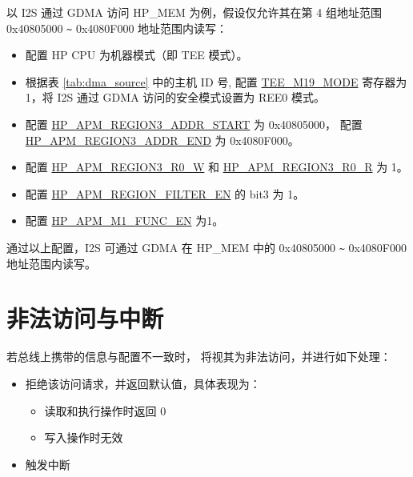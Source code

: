\documentclass[main\_\_CN.tex]{subfiles}
\begin{document}
以 I2S 通过 GDMA 访问 HP\_MEM 为例，假设仅允许其在第 4 组地址范围 0x40805000 \verb+~+ 0x4080F000 地址范围内读写：


\begin{itemize}
    \item 配置 HP CPU 为机器模式（即 TEE 模式）。
    
    \item 根据表 \ref{tab:dma_source} 中的主机 ID 号, 配置 \hyperref[fielddesc:TEEM0MODE]{TEE\_M19\_MODE} 寄存器为 1，将 I2S 通过 GDMA 访问的安全模式设置为 REE0 模式。
    
    \item 配置 \hyperref[regdesc:HPAPMREGION0ADDRSTARTREG]{HP\_APM\_REGION3\_ADDR\_START} 为 0x40805000， 配置 \hyperref[regdesc:HPAPMREGION0ADDRSTARTREG]{HP\_APM\_REGION3\_ADDR\_END} 为 0x4080F000。
    
    \item 配置 \hyperref[fielddesc:HPAPMREGION0R0W]{HP\_APM\_REGION3\_R0\_W} 和 \hyperref[fielddesc:HPAPMREGION0R0R]{HP\_APM\_REGION3\_R0\_R} 为 1。
    
    \item 配置 \hyperref[fielddesc:HPAPMREGIONFILTEREN]{HP\_APM\_REGION\_FILTER\_EN} 的 bit3 为 1。
    
    \item 配置 \hyperref[fielddesc:HPAPMM1FUNCEN]{HP\_APM\_M1\_FUNC\_EN} 为1。
    
\end{itemize}


通过以上配置，I2S 可通过 GDMA 在 HP\_MEM 中的 0x40805000 \verb+~+ 0x4080F000 地址范围内读写。


\section{非法访问与中断}


若总线上携带的信息与配置不一致时，\chipname{} 将视其为非法访问，并进行如下处理：


\begin{itemize}
    \item 拒绝该访问请求，并返回默认值，具体表现为：
    \begin{itemize}
        \item 读取和执行操作时返回 0
        \item 写入操作时无效
    \end{itemize}
    \item 触发中断
\end{itemize}
\end{document}
